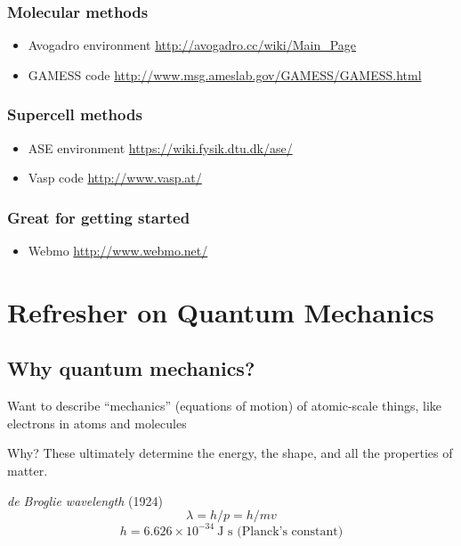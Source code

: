 \documentclass[11pt]{article}
\begin{document}
\subsubsection{Molecular methods}
\label{sec-1-5-1}
\begin{itemize}
\item Avogadro environment \url{http://avogadro.cc/wiki/Main_Page}
\item GAMESS code \url{http://www.msg.ameslab.gov/GAMESS/GAMESS.html}
\end{itemize}

\subsubsection{Supercell methods}
\label{sec-1-5-2}
\begin{itemize}
\item ASE environment \url{https://wiki.fysik.dtu.dk/ase/}
\item Vasp code \url{http://www.vasp.at/}
\end{itemize}

\subsubsection{Great for getting started}
\label{sec-1-5-3}
\begin{itemize}
\item Webmo \url{http://www.webmo.net/}
\end{itemize}
\newpage

\section{Refresher on Quantum Mechanics}
\label{sec-2}
\subsection{Why quantum mechanics?}
\label{sec-2-1}
Want to describe ``mechanics'' (equations of motion) of atomic-scale things,
like electrons in atoms and molecules

Why? These ultimately determine the energy, the shape, and all the properties
of matter.

\emph{de Broglie wavelength} (1924)
\begin{equation}
\lambda  = h/p = h/mv
\end{equation}
\begin{equation}
h  = 6.626 \times 10^{-34}~\text{J s (Planck's constant)}
\end{equation}
\end{document}
